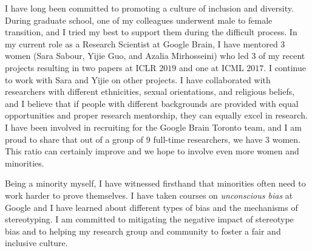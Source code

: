 \documentclass[11pt]{article}
\begin{document}
I have long been committed to promoting a culture of inclusion and
diversity.  During graduate school, one of my colleagues underwent
male to female transition, and I tried my best to support them during
the difficult process. In my current role as a Research Scientist at
Google Brain, I have mentored 3 women (Sara Sabour, Yijie Guo, and
Azalia Mirhosseini) who led $3$ of my recent projects resulting in two
papers at ICLR $2019$ and one at ICML $2017$. I continue to work with
Sara and Yijie on other projects. I have collaborated with researchers
with different ethnicities, sexual orientations, and religious
beliefs, and I believe that if people with different backgrounds are
provided with equal opportunities and proper research mentorship, they
can equally excel in research. I have been involved in recruiting for
the Google Brain Toronto team, and I am proud to share that out of a
group of $9$ full-time researchers, we have $3$ women. This ratio can
certainly improve and we hope to involve even more women and
minorities.

Being a minority myself, I have witnessed firsthand that minorities
often need to work harder to prove themselves. I have taken courses on
{\em unconscious bias} at Google and I have learned about different
types of bias and the mechanisms of stereotyping. I am committed to
mitigating the negative impact of stereotype bias and to helping my
research group and community to foster a fair and inclusive culture.
\end{document}
